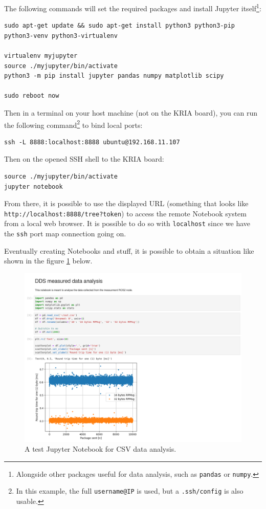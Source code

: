 \documentclass[10pt]{article}
\begin{document}
The following commands will set the required packages and install Jupyter itself\footnote{Alongside other packages useful for data analysis, such as \texttt{pandas} or \texttt{numpy}.}:
\begin{verbatim}
sudo apt-get update && sudo apt-get install python3 python3-pip python3-venv python3-virtualenv

virtualenv myjupyter
source ./myjupyter/bin/activate
python3 -m pip install jupyter pandas numpy matplotlib scipy

sudo reboot now
\end{verbatim}

Then in a terminal on your host machine (not on the KRIA board), you can run the following command\footnote{In this example, the full \texttt{username@IP} is used, but a \texttt{.ssh/config} is also usable.} to bind local ports:
\begin{verbatim}
ssh -L 8888:localhost:8888 ubuntu@192.168.11.107
\end{verbatim}

Then on the opened SSH shell to the KRIA board:
\begin{verbatim}
source ./myjupyter/bin/activate
jupyter notebook
\end{verbatim}

From there, it is possible to use the displayed URL (something that looks like
\texttt{http://localhost:8888/tree?token}) to access the remote Notebook system from a local web browser.
It is possible to do so with \texttt{localhost} since we have the \texttt{ssh} port map connection going on.

Eventually creating Notebooks and stuff, it is possible to obtain a situation like shown in the figure \ref{fig:orgaffa3b4} below.

\begin{figure}[htbp]
\centering
\includegraphics[width=.6\textwidth]{img/jupyter.png}
\caption{\label{fig:orgaffa3b4}A test Jupyter Notebook for CSV data analysis.}
\end{figure}
\end{document}
